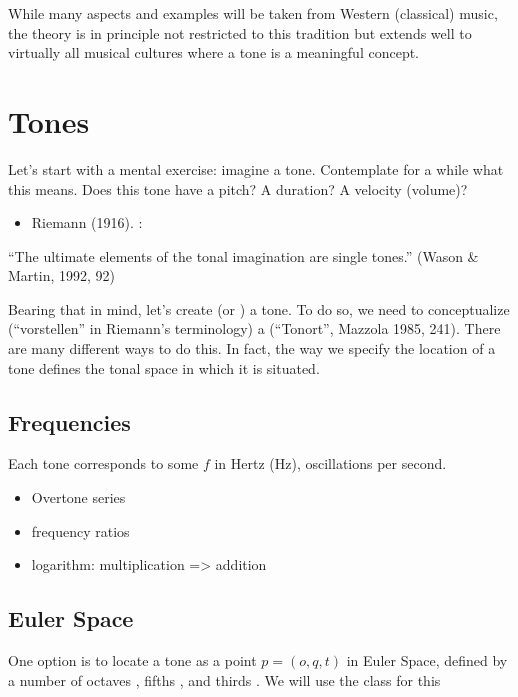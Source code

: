\documentclass[letterpaper,10pt,english]{sphinxmanual}
\begin{document}
While many aspects and examples will be taken
from Western (classical) music, the theory is in principle not restricted to this
tradition but extends well to virtually all musical cultures where a tone is a meaningful concept.


\section{Tones}
\label{\detokenize{1_fundamentals:tones}}
Let’s start with a mental exercise: imagine a tone.
Contemplate for a while what this means.
Does this tone have a pitch? A duration? A velocity (volume)?
\begin{itemize}
\item {} 
Riemann (1916). :

\end{itemize}

“The ultimate elements of the tonal imagination are single tones.” (Wason \& Martin, 1992, 92)

Bearing that in mind, let’s create (or ) a tone. To do so, we need to
conceptualize (“vorstellen” in Riemann’s terminology) a  (“Tonort”, Mazzola 1985, 241).
There are many different ways to do this. In fact, the way we specify the location of a tone
defines the tonal space in which it is situated.


\subsection{Frequencies}
\label{\detokenize{1_fundamentals:frequencies}}
Each tone corresponds to some  \(f\) in Hertz (Hz),
oscillations per second.
\begin{itemize}
\item {} 
Overtone series

\item {} 
frequency ratios

\item {} 
logarithm: multiplication =\textgreater{} addition

\end{itemize}


\subsection{Euler Space}
\label{\detokenize{1_fundamentals:euler-space}}
One option is to locate a tone  as a point \(p=(o, q, t)\) in Euler Space, defined by
a number of octaves , fifths , and thirds . We will use the 
class for this
\end{document}
